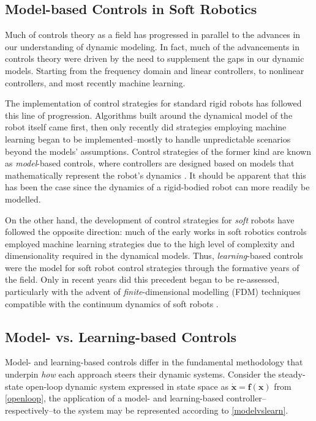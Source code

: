 \subsection{Model-based Controls in Soft Robotics} \label{modelbasedinsoro}
Much of controls theory as a field has progressed in parallel to the advances in our understanding of dynamic modeling. In fact, much of the advancements in controls theory were driven by the need to supplement the gaps in our dynamic models. Starting from the frequency domain and linear controllers, to nonlinear controllers, and most recently machine learning. 

The implementation of control strategies for standard rigid robots has followed this line of progression. Algorithms built around the dynamical model of the robot itself came first, then only recently did strategies employing machine learning began to be implemented--mostly to handle unpredictable scenarios beyond the models' assumptions. Control strategies of the former kind are known as \textit{model}-based controls, where controllers are designed based on models that mathematically represent the robot's dynamics \cite{rakhmatillaev_integrative_2025}. It should be apparent that this has been the case since the dynamics of a rigid-bodied robot can more readily be modelled. 

On the other hand, the development of control strategies for \textit{soft} robots have followed the opposite direction: much of the early works in soft robotics controls employed machine learning strategies due to the high level of complexity and dimensionality required in the dynamical models. Thus, \textit{learning}-based controls were the model for soft robot control strategies through the formative years of the field. Only in recent years did this precedent began to be re-assessed, particularly with the advent of \textit{finite}-dimensional modelling (FDM) techniques compatible with the continuum dynamics of soft robots \cite{della_santina_model-based_2023}.
\subsection{Model- vs. Learning-based Controls} \label{modelvlearndef}

Model- and learning-based controls differ in the fundamental methodology that underpin \textit{how} each approach steers their dynamic systems. Consider the steady-state open-loop dynamic system expressed in state space as $\mathbf{\dot{x}}=\mathbf{f}(\mathbf{x})$ from \autoref{openloop}, the application of a model- and learning-based controller--respectively--to the system may be represented according to \autoref{modelvslearn}.

